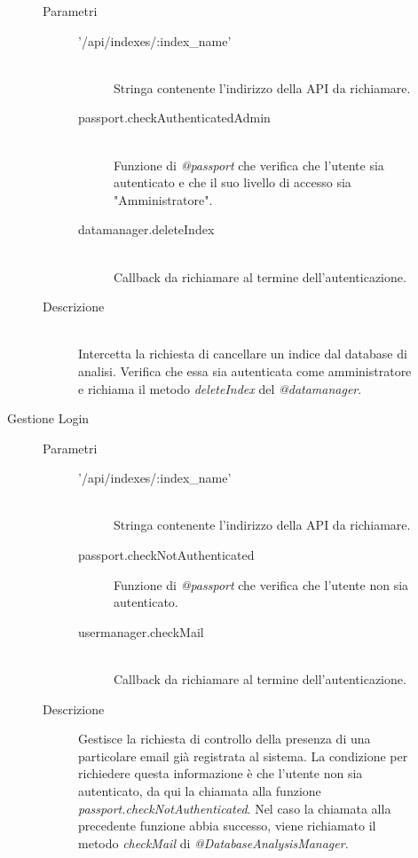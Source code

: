\begin{description}
\begin{description}
\begin{mldescription}
     \hfill 
 \begin{description}
    \item[Parametri] \hfill
     \begin{description}
      \item['/api/indexes/:index\_name'] \hfill \\
      Stringa contenente l'indirizzo della API da richiamare.
      \item[passport.checkAuthenticatedAdmin] \hfill \\
      Funzione di \textit{@passport} che verifica che l'utente sia autenticato e che il suo livello di accesso sia "Amministratore".
      \item[datamanager.deleteIndex] \hfill \\
      Callback da richiamare al termine dell'autenticazione.
     \end{description}
    \item[Descrizione] \hfill \\
    Intercetta la richiesta di cancellare un indice dal database di analisi. Verifica che essa sia autenticata come amministratore e richiama il metodo \textit{deleteIndex} del \textit{@datamanager}.
   \end{description}
 
 \end{mldescription} 
 
 \item[Gestione Login]
 \begin{mldescription}
 \begin{description}
    \item[Parametri] \hfill
     \begin{description}
      \item['/api/indexes/:index\_name'] \hfill \\
      Stringa contenente l'indirizzo della API da richiamare.
      \item[passport.checkNotAuthenticated]
      Funzione di \textit{@passport} che verifica che l'utente non sia autenticato.
      \item[usermanager.checkMail] \hfill \\
      Callback da richiamare al termine dell'autenticazione.
     \end{description}
    \item[Descrizione]
    Gestisce la richiesta di controllo della presenza di una particolare email già registrata al sistema. La condizione per richiedere questa informazione è che l'utente non sia autenticato, da qui la chiamata alla funzione \textit{passport.checkNotAuthenticated}. Nel caso la chiamata alla precedente funzione abbia successo, viene richiamato il metodo \textit{checkMail} di \textit{@DatabaseAnalysisManager}.
 \end{description}
 

\end{mldescription}
\end{description}
\end{description}
